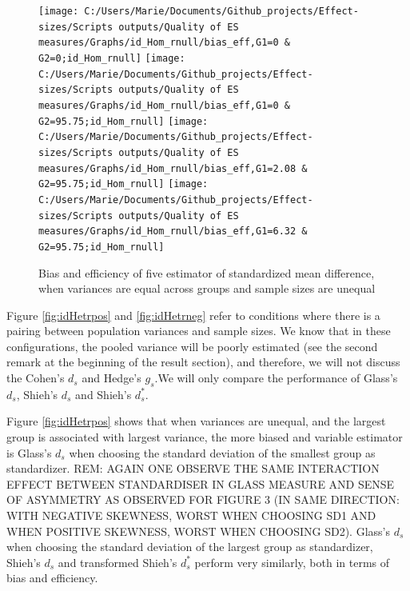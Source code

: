 \documentclass[
  man,floatsintext]{apa6}
\begin{document}
\begin{figure}

{\centering \texttt{[image: C:/Users/Marie/Documents/Github\_projects/Effect-sizes/Scripts outputs/Quality of ES measures/Graphs/id\_Hom\_rnull/bias\_eff,G1=0 \& G2=0;id\_Hom\_rnull]} \texttt{[image: C:/Users/Marie/Documents/Github\_projects/Effect-sizes/Scripts outputs/Quality of ES measures/Graphs/id\_Hom\_rnull/bias\_eff,G1=0 \& G2=95.75;id\_Hom\_rnull]} \texttt{[image: C:/Users/Marie/Documents/Github\_projects/Effect-sizes/Scripts outputs/Quality of ES measures/Graphs/id\_Hom\_rnull/bias\_eff,G1=2.08 \& G2=95.75;id\_Hom\_rnull]} \texttt{[image: C:/Users/Marie/Documents/Github\_projects/Effect-sizes/Scripts outputs/Quality of ES measures/Graphs/id\_Hom\_rnull/bias\_eff,G1=6.32 \& G2=95.75;id\_Hom\_rnull]} 

}

\caption{Bias and efficiency of five estimator of standardized mean difference, when variances are equal across groups and sample sizes are unequal}\label{fig:idHomrnull}
\end{figure}

Figure \ref{fig:idHetrpos} and \ref{fig:idHetrneg} refer to conditions where there is a pairing between population variances and sample sizes. We know that in these configurations, the pooled variance will be poorly estimated (see the second remark at the beginning of the result section), and therefore, we will not discuss the Cohen's \(d_s\) and Hedge's \(g_s\).We will only compare the performance of Glass's \(d_s\), Shieh's \(d_s\) and Shieh's \(d^*_s\).

Figure \ref{fig:idHetrpos} shows that when variances are unequal, and the largest group is associated with largest variance, the more biased and variable estimator is Glass's \(d_s\) when choosing the standard deviation of the smallest group as standardizer.
REM: AGAIN ONE OBSERVE THE SAME INTERACTION EFFECT BETWEEN STANDARDISER IN GLASS MEASURE AND SENSE OF ASYMMETRY AS OBSERVED FOR FIGURE 3 (IN SAME DIRECTION: WITH NEGATIVE SKEWNESS, WORST WHEN CHOOSING SD1 AND WHEN POSITIVE SKEWNESS, WORST WHEN CHOOSING SD2). Glass's \(d_s\) when choosing the standard deviation of the largest group as standardizer, Shieh's \(d_s\) and transformed Shieh's \(d^*_s\) perform very similarly, both in terms of bias and efficiency.
\end{document}
